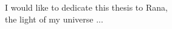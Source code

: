 
\begin{dedication} %

I would like to dedicate this thesis to Rana, \\the light of my universe ...

\end{dedication}


